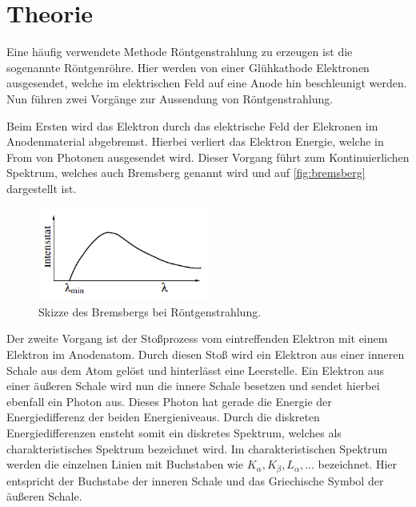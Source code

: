 \section{Theorie}
\label{sec:Theorie}




Eine häufig verwendete Methode Röntgenstrahlung zu erzeugen ist die sogenannte Röntgenröhre.
Hier werden von einer Glühkathode Elektronen ausgesendet, welche im elektrischen Feld auf eine Anode hin beschleunigt werden.
Nun führen zwei Vorgänge zur Aussendung von Röntgenstrahlung.

Beim Ersten wird das Elektron durch das elektrische Feld der Elekronen im Anodenmaterial abgebremst.
Hierbei verliert das Elektron Energie, welche in From von Photonen ausgesendet wird.
Dieser Vorgang führt zum Kontinuierlichen Spektrum, welches auch Bremsberg genannt wird und auf \autoref{fig:bremsberg} dargestellt ist.

\begin{figure}
    \centering
    \includegraphics[width=0.5\textwidth]{images/bremsberg.png}
    \caption{Skizze des Bremsbergs bei Röntgenstrahlung.\cite{V602}}
    \label{fig:bremsberg}
\end{figure}

Der zweite Vorgang ist der Stoßprozess vom eintreffenden Elektron mit einem Elektron im Anodenatom.
Durch diesen Stoß wird ein Elektron aus einer inneren Schale aus dem Atom gelöst und hinterlässt eine Leerstelle.
Ein Elektron aus einer äußeren Schale wird nun die innere Schale besetzen und sendet hierbei ebenfall ein Photon aus.
Dieses Photon hat gerade die Energie der Energiedifferenz der beiden Energieniveaus.
Durch die diskreten Energiedifferenzen ensteht somit ein diskretes Spektrum, welches als charakteristisches Spektrum bezeichnet wird.
Im charakteristischen Spektrum werden die einzelnen Linien mit Buchstaben wie $K_\alpha,K_\beta,L_\alpha,...$ bezeichnet.
Hier entspricht der Buchstabe der inneren Schale und das Griechische Symbol der äußeren Schale.


